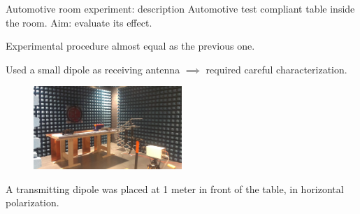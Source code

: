\documentclass{beamer}
\begin{document}
\begin{frame}{Automotive room experiment: description}
    \footnotesize
    Automotive test compliant table inside the room. Aim: evaluate its effect. 
    \vspace{3mm}

    Experimental procedure almost equal as the previous one.
    \vspace{3mm}

    Used a small dipole as receiving antenna $\implies$ required careful characterization.

    \begin{figure}
        \centering
        \includegraphics[width=0.5\textwidth]{img/camera.jpg}
    \end{figure}
    A transmitting dipole was placed at 1 meter in front of the table, in horizontal polarization. 
\end{frame}
\end{document}

